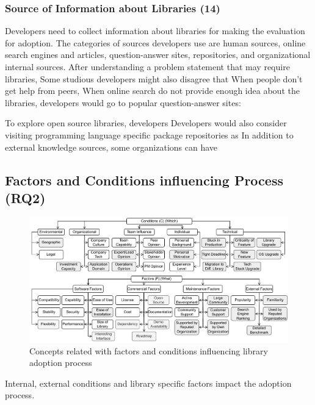 \subsubsection{Source of Information about Libraries (14)} Developers need to collect information about libraries for making the evaluation for adoption. The categories of sources developers use are human sources, online search engines and articles, question-answer sites, repositories, and organizational internal sources. After understanding a problem statement that may require libraries,  Some studious developers might also disagree that  When people don't get help from peers,  When online search do not provide enough idea about the libraries, developers would go to popular question-answer sites: 

To explore open source libraries, developers  Developers would also consider visiting programming language specific package repositories as  In addition to external knowledge sources, some organizations can have 

\subsection{Factors and Conditions influencing Process (RQ2)}
\begin{figure}
    \centering
    \includegraphics[scale=0.85]{images/conditions.pdf}
    \caption{Concepts related with factors and conditions influencing library adoption process}
    \label{fig:conditions}
\end{figure}
Internal, external conditions and library specific factors impact the adoption process.

